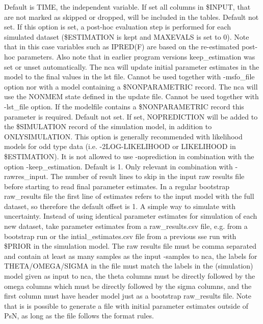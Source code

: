 \begin{optionlist}
\nextopt
{}
Default is TIME, the independent variable. 
\nextopt
{}
If set all columns in \$INPUT, that are not marked as skipped or dropped, will be included in the tables.
\nextopt
{}
Default not set. If this option is set, a post-hoc evaluation step is performed for each simulated dataset (\$ESTIMATION is kept and MAXEVALS is set to 0). Note that in this case variables such as IPRED(F) are based on the re-estimated post-hoc parameters. Also note that in earlier program versions keep\_estimation was set or unset automatically. 
\nextopt
{}
The nca will update initial parameter estimates in the model to the final values in the lst file. Cannot be used together with -msfo\_file option nor with a model containing a \$NONPARAMETRIC record.
\nextopt
{}
The nca will use the NONMEM state defined in the update file. Cannot be used together with -lst\_file option. If the modelfile contains a \$NONPARAMETRIC record this parameter is required.
\nextopt
{}
Default not set. If set, NOPREDICTION will be added to the \$SIMULATION record of the simulation model, in addition to ONLYSIMULATION. This option is generally recommended with likelihood models for odd type data (i.e. -2LOG-LIKELIHOOD or LIKELIHOOD in \$ESTIMATION). It is not allowed to use -noprediction in combination with the option \mbox{-keep\_estimation}. 
\nextopt
{}
Default is 1. Only relevant in combination with -rawres\_input. The number of result lines to skip in the input raw results file before starting to read final parameter estimates. In a regular bootstrap raw\_results file the first line of estimates refers to the input model with the full dataset, so therefore the default offset is 1. 
\nextopt
{}
A simple way to simulate with uncertainty. Instead of using identical parameter estimates for simulation of each new dataset, take parameter estimates from a raw\_results.csv file, e.g. from a bootstrap run or the intial\_estimates.csv file from a previous sse run with \$PRIOR in the simulation model. The raw results file must be comma separated and contain at least as many samples as the input -samples to nca, the labels for THETA/OMEGA/SIGMA in the file must match the labels in the (simulation) model given as input to nca, the theta columns must be directly followed by the omega columns which must be directly followed by the sigma columns, and the first column must have header model just as a bootstrap raw\_results file. Note that is is possible to generate a file with initial parameter estimates outside of PsN, as long as the file follows the format rules. 

\end{optionlist}
